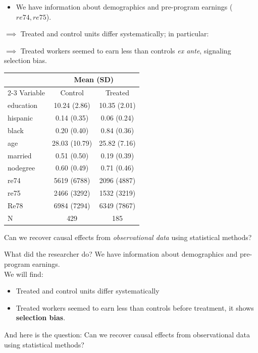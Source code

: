 \documentclass[11pt,aspectratio=169]{beamer}
\begin{document}
\begin{frame}
\begin{itemize}
    \item We have information about demographics and pre-program earnings ($re74, re75$).
\end{itemize}

$\implies$ Treated and control units differ systematically; in particular:

$\implies$ Treated workers seemed to earn less than controls \emph{ex ante}, signaling selection bias.

\begin{center}
\begin{tabular}{lcc}
\hline
& \multicolumn{2}{c}{\textbf{Mean (SD)}} \\
\cline{2-3}
Variable & Control & Treated \\
\hline
education & 10.24 (2.86) & 10.35 (2.01) \\
hispanic & 0.14 (0.35) & 0.06 (0.24) \\
black & 0.20 (0.40) & 0.84 (0.36) \\
age & 28.03 (10.79) & 25.82 (7.16) \\
married & 0.51 (0.50) & 0.19 (0.39) \\
\hline
nodegree & 0.60 (0.49) & 0.71 (0.46) \\
re74 & 5619 (6788) & 2096 (4887) \\
re75 & 2466 (3292) & 1532 (3219) \\
Re78 & 6984 (7294) & 6349 (7867) \\
N & 429 & 185 \\
\hline
\end{tabular}
\end{center}

Can we recover causal effects from \emph{observational data} using statistical methods?

\end{frame}



\begin{frame}{What did the researcher do?}
We have information about demographics and pre-program earnings.\\
We will find:
\begin{itemize}
  \item Treated and control units differ systematically
  \item Treated workers seemed to earn less than controls before treatment, it shows \textbf{selection bias}.
\end{itemize}

And here is the question: Can we recover causal effects from observational data using statistical methods?


\end{frame}
\end{document}
